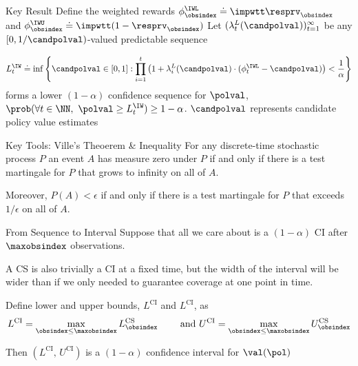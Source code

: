 \documentclass[aspectratio=169, professionalfonts]{beamer}
\begin{document}
\begin{frame}{Key Result}
	Define the weighted rewards $\phi_\obsindex^\IWL \doteq \impwtt \resprv_\obsindex$ and $\phi_\obsindex^\IWU \doteq
		\impwtt(1-\resprv_\obsindex)$
	\vfill
	Let   $(\lambda_t^L(\candpolval))_{t=1}^\infty$ be any $[0, 1/\candpolval)$-valued
	predictable sequence

	\vfill
	\begin{equation}\label{eq:kmr-cs}
		L_t^\IW \doteq \inf\left \{ \candpolval \in [0, 1] : \prod_{i=1}^t \left ( 1 + \lambda_i^L(\candpolval) \cdot (\phi_t^\IWL - \candpolval) \right ) < \frac{1}{\alpha} \right \}
	\end{equation}
	forms a lower $(1-\alpha)$ confidence sequence for $\polval$, $\prob(\forall t \in \NN,\ \polval \geq L_t^\IW) \geq 1-\alpha$.
	\vfill \pause
	$\candpolval$ represents candidate policy value estimates
\end{frame}

\begin{frame}{Key Tools: Ville's Theoerem \& Inequality}
	For any discrete-time stochastic process $P$ an event $A$ has measure zero under
	$P$ if and only if there is a test martingale for $P$ that grows to
	infinity on all of $A$.

	\vfill \pause

	Moreover, $P(A) < \epsilon$ if and only if there is a test
	martingale for $P$ that exceeds $1/\epsilon$ on all of $A$.

	\vfill \pause
\end{frame}

\begin{frame}{From Sequence to Interval}
	Suppose that all we care about is a $(1 - \alpha)$ CI after $\maxobsindex$
	observations.

	\vfill
	A CS is also trivially a CI at a fixed time, but the width of the interval
	will be wider than if we only needed to guarantee coverage at one point in
	time.

	\vfill \pause

	\begin{lemma} Define lower and upper bounds, $L^{\text{CI}}$ and
		$L^{\text{CI}}$, as
		$$L^{\text{CI}} = \max_{\obsindex \leq \maxobsindex}
			L_{\obsindex}^{\text{CS}} \qquad \text{ and } U^{\text{CI}} = \max_{\obsindex \leq
				\maxobsindex} U_{\obsindex}^{\text{CS}}$$

		Then $(L^{\text{CI}},\, U^{\text{CI}})$ is a $(1 - \alpha)$ confidence
		interval for $\val(\pol)$
	\end{lemma}
\end{frame}
\end{document}
